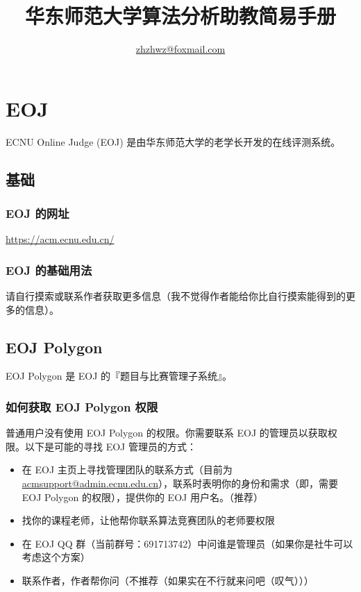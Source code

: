 \documentclass{article}
\title{华东师范大学算法分析助教简易手册}
\author{\href{mailto:zhzhwz@foxmail.com}{zhzhwz@foxmail.com}}
\begin{document}
\maketitle
\tableofcontents
\newpage

\section{EOJ}

ECNU Online Judge (EOJ) 是由华东师范大学的老学长开发的在线评测系统。

\subsection{基础}

\subsubsection{EOJ 的网址}

\href{https://acm.ecnu.edu.cn/}{https://acm.ecnu.edu.cn/}

\subsubsection{EOJ 的基础用法}

请自行摸索或联系作者获取更多信息（我不觉得作者能给你比自行摸索能得到的更多的信息）。

\subsection{EOJ Polygon}

EOJ Polygon 是 EOJ 的『题目与比赛管理子系统』。

\subsubsection{如何获取 EOJ Polygon 权限}

\label{sssec_eoj_admin}

普通用户没有使用 EOJ Polygon 的权限。你需要联系 EOJ 的管理员以获取权限。以下是可能的寻找 EOJ 管理员的方式：

\begin{itemize}
    \item 在 EOJ 主页上寻找管理团队的联系方式（目前为 \href{mailto:acmsupport@admin.ecnu.edu.cn}{acmsupport@admin.ecnu.edu.cn}），联系时表明你的身份和需求（即，需要 EOJ Polygon 的权限），提供你的 EOJ 用户名。（推荐）
    \item 找你的课程老师，让他帮你联系算法竞赛团队的老师要权限
    \item 在 EOJ QQ 群（当前群号：691713742）中问谁是管理员（如果你是社牛可以考虑这个方案）
    \item 联系作者，作者帮你问（不推荐（如果实在不行就来问吧（叹气）））
\end{itemize}
\end{document}
